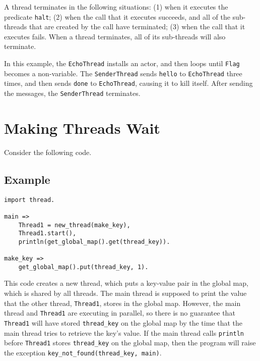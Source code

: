 A thread terminates in the following situations: (1) when it executes the predicate \texttt{halt}; (2) when the call that it executes succeeds, and all of the sub-threads that are created by the call have terminated; (3) when the call that it executes fails. When a thread terminates, all of its sub-threads will also terminate.

In this example, the \texttt{EchoThread} installs an actor, and then loops until \texttt{Flag} becomes a non-variable.  The \texttt{SenderThread} sends \texttt{hello} to \texttt{EchoThread} three times, and then sends \texttt{done} to \texttt{EchoThread}, causing it to kill itself. After sending the messages, the \texttt{SenderThread} terminates.

\section{Making Threads Wait}
Consider the following code.

\subsection*{Example}
\begin{verbatim}
import thread.

main =>
    Thread1 = new_thread(make_key),
    Thread1.start(),
    println(get_global_map().get(thread_key)).

make_key =>
    get_global_map().put(thread_key, 1).
\end{verbatim}

This code creates a new thread, which puts a key-value pair in the global map, which is shared by all threads.  The main thread is supposed to print the value that the other thread, \texttt{Thread1}, stores in the global map.  However, the main thread and \texttt{Thread1} are executing in parallel, so there is no guarantee that \texttt{Thread1} will have stored \texttt{thread\_key} on the global map by the time that the main thread tries to retrieve the key's value.  If the main thread calls \texttt{println} before \texttt{Thread1} stores \texttt{thread\_key} on the global map, then the program will raise the exception \texttt{key\_not\_found(thread\_key, main)}.

